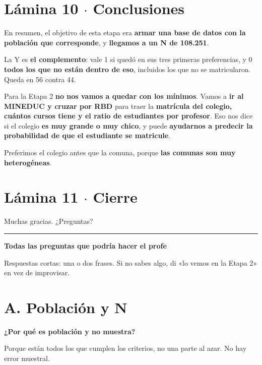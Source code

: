 \documentclass[11pt]{article}
\begin{document}
\section*{Lámina 10 $\cdot$ Conclusiones}

\begin{guion}En resumen, el objetivo de esta etapa era \textbf{armar una base de datos con la población que corresponde}, y \textbf{llegamos a un N de 108.251}.\par La Y es \textbf{el complemento}: vale 1 si quedó en sus tres primeras preferencias, y 0 \textbf{todos los que no están dentro de eso}, incluidos los que no se matricularon. Queda en 56 contra 44.\par Para la Etapa 2 \textbf{no nos vamos a quedar con los mínimos}. Vamos a \textbf{ir al MINEDUC y cruzar por RBD} para traer la \textbf{matrícula del colegio, cuántos cursos tiene y el ratio de estudiantes por profesor}. Eso nos dice si el colegio \textbf{es muy grande o muy chico}, y puede \textbf{ayudarnos a predecir la probabilidad de que el estudiante se matricule}.\par Preferimos el colegio antes que la comuna, porque \textbf{las comunas son muy heterogéneas}.\end{guion}

\section*{Lámina 11 $\cdot$ Cierre}

\begin{guion}Muchas gracias. ¿Preguntas?\end{guion}


\medskip\hrule\medskip

{\LARGE\bfseries Todas las preguntas que podría hacer el profe\par}\medskip

Respuestas cortas: una o dos frases. Si no sabes algo, di «lo vemos en la Etapa 2» en vez de improvisar.\par

\section*{A. Población y N}

\textbf{¿Por qué es población y no muestra?}\par
\begin{guion}Porque están todos los que cumplen los criterios, no una parte al azar. No hay error muestral.\end{guion}
\end{document}
